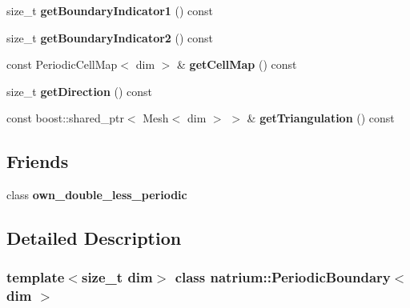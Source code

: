 \begin{DoxyCompactItemize}
\item 
\hypertarget{classnatrium_1_1PeriodicBoundary_aead325214d43693a03a5d24613f4fe14}{
size\_\-t {\bfseries getBoundaryIndicator1} () const }
\label{classnatrium_1_1PeriodicBoundary_aead325214d43693a03a5d24613f4fe14}

\item 
\hypertarget{classnatrium_1_1PeriodicBoundary_af7e6f5b6028b0499df8335377156bc26}{
size\_\-t {\bfseries getBoundaryIndicator2} () const }
\label{classnatrium_1_1PeriodicBoundary_af7e6f5b6028b0499df8335377156bc26}

\item 
\hypertarget{classnatrium_1_1PeriodicBoundary_a4200caafcbda9553552220303e26bad0}{
const PeriodicCellMap$<$ dim $>$ \& {\bfseries getCellMap} () const }
\label{classnatrium_1_1PeriodicBoundary_a4200caafcbda9553552220303e26bad0}

\item 
\hypertarget{classnatrium_1_1PeriodicBoundary_a49e51f3612f67060f6189c3f92f64025}{
size\_\-t {\bfseries getDirection} () const }
\label{classnatrium_1_1PeriodicBoundary_a49e51f3612f67060f6189c3f92f64025}

\item 
\hypertarget{classnatrium_1_1PeriodicBoundary_ac02d8bae511dcb9d63d5da8478f2cb03}{
const boost::shared\_\-ptr$<$ Mesh$<$ dim $>$ $>$ \& {\bfseries getTriangulation} () const }
\label{classnatrium_1_1PeriodicBoundary_ac02d8bae511dcb9d63d5da8478f2cb03}

\end{DoxyCompactItemize}
\subsection*{Friends}
\begin{DoxyCompactItemize}
\item 
\hypertarget{classnatrium_1_1PeriodicBoundary_a92462e8f67aa8d5e91e018a1cce70842}{
class {\bfseries own\_\-double\_\-less\_\-periodic}}
\label{classnatrium_1_1PeriodicBoundary_a92462e8f67aa8d5e91e018a1cce70842}

\end{DoxyCompactItemize}


\subsection{Detailed Description}
\subsubsection*{template$<$size\_\-t dim$>$ class natrium::PeriodicBoundary$<$ dim $>$}

